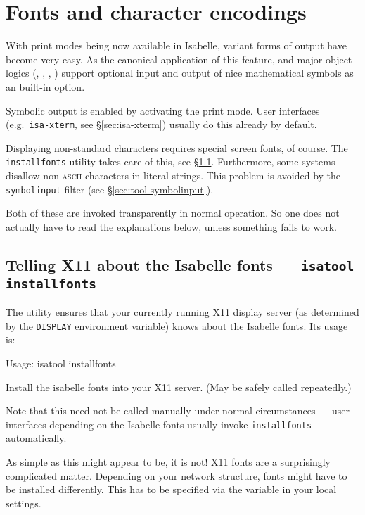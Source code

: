 
\chapter{Fonts and character encodings}

With print modes being now available in Isabelle, variant forms of
output have become very easy. As the canonical application of this
feature, {\Pure} and major object-logics (\FOL, \ZF, \HOL, \HOLCF)
support optional input and output of nice mathematical symbols as an
built-in option.

Symbolic output is enabled by activating the  print
mode. User interfaces (e.g.\ \texttt{isa-xterm}, see
\S\ref{sec:isa-xterm}) usually do this already by default.

\medskip Displaying non-standard characters requires special screen
fonts, of course. The \texttt{installfonts} utility takes care of
this, see \S\ref{sec:tool-installfonts}. Furthermore, some {\ML}
systems disallow non-\textsc{ascii} characters in literal strings.
This problem is avoided by the \texttt{symbolinput} filter (see
\S\ref{sec:tool-symbolinput}).

Both of these are invoked transparently in normal operation. So one
does not actually have to read the explanations below, unless
something fails to work.


\section{Telling X11 about the Isabelle fonts --- \texttt{isatool installfonts}}
\label{sec:tool-installfonts}

The  utility ensures that your currently running
X11 display server (as determined by the \texttt{DISPLAY} environment
variable) knows about the Isabelle fonts. Its usage is:
\begin{ttbox}
Usage: isatool installfonts

  Install the isabelle fonts into your X11 server.
  (May be safely called repeatedly.)
\end{ttbox}
Note that this need not be called manually under normal circumstances
--- user interfaces depending on the Isabelle fonts usually invoke
\texttt{installfonts} automatically.

\medskip As simple as this might appear to be, it is not! X11 fonts
are a surprisingly complicated matter. Depending on your network
structure, fonts might have to be installed differently. This has to
be specified via the  variable in your
local settings.

